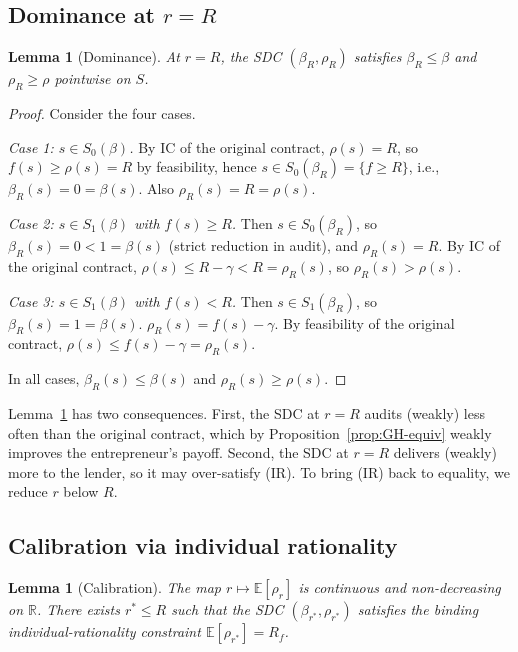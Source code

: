 \documentclass[11pt,a4paper,oneside]{book}
\def\R{\mathbb{R}}
\def\E{\mathbb{E}}
\def\leq{\leqslant}
\def\geq{\geqslant}
\theoremstyle{plain}
\newtheorem{lemma}[theorem]{Lemma}
\theoremstyle{definition}
\theoremstyle{remark}
\numberwithin{equation}{chapter}
\begin{document}
\subsection{Dominance at $r = R$}

\begin{lemma}[Dominance]\label{lem:SDC-dominance}
At $r = R$, the SDC $(\beta_R, \rho_R)$ satisfies $\beta_R \leq \beta$ and $\rho_R \geq \rho$ pointwise on $S$.
\end{lemma}

\begin{proof}
Consider the four cases.

\emph{Case 1: $s \in S_0(\beta)$.}
By IC of the original contract, $\rho(s) = R$, so $f(s) \geq \rho(s) = R$ by feasibility, hence $s \in S_0(\beta_R) = \{ f \geq R \}$, i.e., $\beta_R(s) = 0 = \beta(s)$.
Also $\rho_R(s) = R = \rho(s)$.

\emph{Case 2: $s \in S_1(\beta)$ with $f(s) \geq R$.}
Then $s \in S_0(\beta_R)$, so $\beta_R(s) = 0 < 1 = \beta(s)$ (strict reduction in audit), and $\rho_R(s) = R$.
By IC of the original contract, $\rho(s) \leq R - \gamma < R = \rho_R(s)$, so $\rho_R(s) > \rho(s)$.

\emph{Case 3: $s \in S_1(\beta)$ with $f(s) < R$.}
Then $s \in S_1(\beta_R)$, so $\beta_R(s) = 1 = \beta(s)$.
$\rho_R(s) = f(s) - \gamma$.
By feasibility of the original contract, $\rho(s) \leq f(s) - \gamma = \rho_R(s)$.

In all cases, $\beta_R(s) \leq \beta(s)$ and $\rho_R(s) \geq \rho(s)$.
\end{proof}

Lemma~\ref{lem:SDC-dominance} has two consequences.
First, the SDC at $r = R$ audits (weakly) less often than the original contract, which by Proposition~\ref{prop:GH-equiv} weakly improves the entrepreneur's payoff.
Second, the SDC at $r = R$ delivers (weakly) more to the lender, so it may over-satisfy (IR).
To bring (IR) back to equality, we reduce $r$ below $R$.

\subsection{Calibration via individual rationality}

\begin{lemma}[Calibration]\label{lem:SDC-calibration}
The map $r \mapsto \E[\rho_r]$ is continuous and non-decreasing on $\R$.
There exists $r^\ast \leq R$ such that the SDC $(\beta_{r^\ast}, \rho_{r^\ast})$ satisfies the binding individual-rationality constraint $\E[\rho_{r^\ast}] = R_f$.
\end{lemma}
\end{document}

